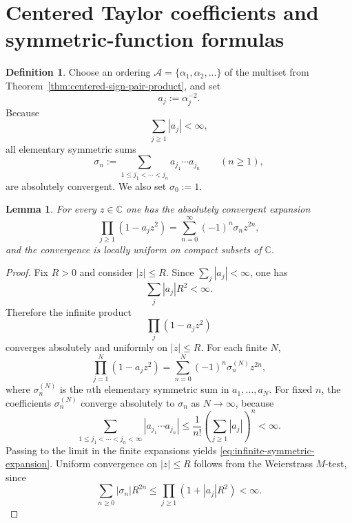 \documentclass[11pt,a4paper]{article}
\newtheorem{lemma}[theorem]{Lemma}
\theoremstyle{definition}
\newtheorem{definition}[theorem]{Definition}
\theoremstyle{remark}
\newcommand{\CC}{\mathbb C}
\begin{document}
\section{Centered Taylor coefficients and symmetric-function formulas}

\begin{definition}
Choose an ordering $\mathcal A=\{\alpha_1,\alpha_2,\dots\}$ of the multiset from Theorem~\ref{thm:centered-sign-pair-product}, and set
\[
a_j:=\alpha_j^{-2}.
\]
Because
\[
\sum_{j\ge 1}|a_j|<\infty,
\]
all elementary symmetric sums
\begin{equation}\label{eq:elementary-symmetric-def}
\sigma_n:=\sum_{1\le j_1<\cdots<j_n} a_{j_1}\cdots a_{j_n}
\qquad (n\ge 1),
\end{equation}
are absolutely convergent.  We also set $\sigma_0:=1$.
\end{definition}

\begin{lemma}\label{lem:infinite-symmetric-expansion}
For every $z\in\CC$ one has the absolutely convergent expansion
\begin{equation}\label{eq:infinite-symmetric-expansion}
\prod_{j\ge 1}(1-a_j z^2)=\sum_{n=0}^{\infty}(-1)^n\sigma_n z^{2n},
\end{equation}
and the convergence is locally uniform on compact subsets of $\CC$.
\end{lemma}

\begin{proof}
Fix $R>0$ and consider $|z|\le R$.  Since $\sum_j |a_j|<\infty$, one has
\[
\sum_j |a_j|R^2<\infty.
\]
Therefore the infinite product
\[
\prod_j (1-a_j z^2)
\]
converges absolutely and uniformly on $|z|\le R$.  For each finite $N$,
\[
\prod_{j=1}^N(1-a_j z^2)=\sum_{n=0}^{N}(-1)^n\sigma_n^{(N)} z^{2n},
\]
where $\sigma_n^{(N)}$ is the $n$th elementary symmetric sum in $a_1,\dots,a_N$.  For fixed $n$, the coefficients $\sigma_n^{(N)}$ converge absolutely to $\sigma_n$ as $N\to\infty$, because
\[
\sum_{1\le j_1<\cdots<j_n<\infty}|a_{j_1}\cdots a_{j_n}|
\le \frac{1}{n!}\left(\sum_{j\ge 1}|a_j|\right)^n<\infty.
\]
Passing to the limit in the finite expansions yields \eqref{eq:infinite-symmetric-expansion}.  Uniform convergence on $|z|\le R$ follows from the Weierstrass $M$-test, since
\[
\sum_{n\ge 0}|\sigma_n|R^{2n}\le \prod_{j\ge 1}(1+|a_j|R^2)<\infty.
\]
\end{proof}
\end{document}
